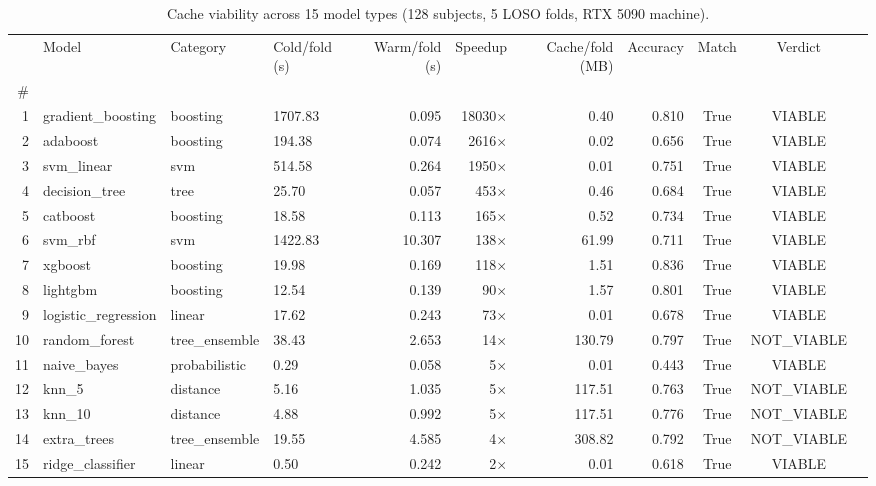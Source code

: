 \begin{table}
\caption{Cache viability across 15 model types (128 subjects, 5 LOSO folds, RTX 5090 machine).}
\label{tab:cache_viability}
\begin{tabular}{rlllrrrrccl}
\toprule
 & Model & Category & Cold/fold (s) & Warm/fold (s) & Speedup & Cache/fold (MB) & Accuracy & Match & Verdict \\
\# &  &  &  &  &  &  &  &  &  \\
\midrule
1 & gradient\_boosting & boosting & 1707.83 & 0.095 & 18030$\times$ & 0.40 & 0.810 & True & VIABLE \\
2 & adaboost & boosting & 194.38 & 0.074 & 2616$\times$ & 0.02 & 0.656 & True & VIABLE \\
3 & svm\_linear & svm & 514.58 & 0.264 & 1950$\times$ & 0.01 & 0.751 & True & VIABLE \\
4 & decision\_tree & tree & 25.70 & 0.057 & 453$\times$ & 0.46 & 0.684 & True & VIABLE \\
5 & catboost & boosting & 18.58 & 0.113 & 165$\times$ & 0.52 & 0.734 & True & VIABLE \\
6 & svm\_rbf & svm & 1422.83 & 10.307 & 138$\times$ & 61.99 & 0.711 & True & VIABLE \\
7 & xgboost & boosting & 19.98 & 0.169 & 118$\times$ & 1.51 & 0.836 & True & VIABLE \\
8 & lightgbm & boosting & 12.54 & 0.139 & 90$\times$ & 1.57 & 0.801 & True & VIABLE \\
9 & logistic\_regression & linear & 17.62 & 0.243 & 73$\times$ & 0.01 & 0.678 & True & VIABLE \\
10 & random\_forest & tree\_ensemble & 38.43 & 2.653 & 14$\times$ & 130.79 & 0.797 & True & NOT\_VIABLE \\
11 & naive\_bayes & probabilistic & 0.29 & 0.058 & 5$\times$ & 0.01 & 0.443 & True & VIABLE \\
12 & knn\_5 & distance & 5.16 & 1.035 & 5$\times$ & 117.51 & 0.763 & True & NOT\_VIABLE \\
13 & knn\_10 & distance & 4.88 & 0.992 & 5$\times$ & 117.51 & 0.776 & True & NOT\_VIABLE \\
14 & extra\_trees & tree\_ensemble & 19.55 & 4.585 & 4$\times$ & 308.82 & 0.792 & True & NOT\_VIABLE \\
15 & ridge\_classifier & linear & 0.50 & 0.242 & 2$\times$ & 0.01 & 0.618 & True & VIABLE \\
\bottomrule
\end{tabular}
\end{table}
